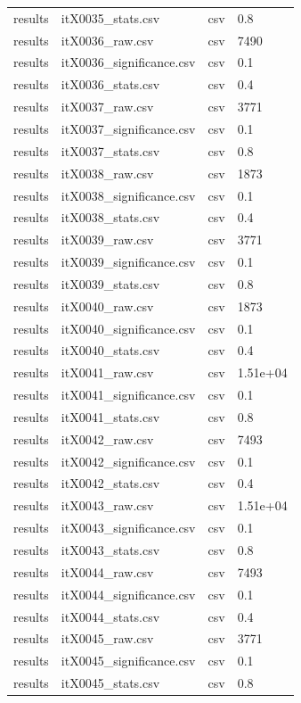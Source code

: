 \begin{landscape}
\begin{longtable}{p{}p{}p{}p{}}
results & itX0035\_stats.csv & csv & 0.8 \\
results & itX0036\_raw.csv & csv & 7490 \\
results & itX0036\_significance.csv & csv & 0.1 \\
results & itX0036\_stats.csv & csv & 0.4 \\
results & itX0037\_raw.csv & csv & 3771 \\
results & itX0037\_significance.csv & csv & 0.1 \\
results & itX0037\_stats.csv & csv & 0.8 \\
results & itX0038\_raw.csv & csv & 1873 \\
results & itX0038\_significance.csv & csv & 0.1 \\
results & itX0038\_stats.csv & csv & 0.4 \\
results & itX0039\_raw.csv & csv & 3771 \\
results & itX0039\_significance.csv & csv & 0.1 \\
results & itX0039\_stats.csv & csv & 0.8 \\
results & itX0040\_raw.csv & csv & 1873 \\
results & itX0040\_significance.csv & csv & 0.1 \\
results & itX0040\_stats.csv & csv & 0.4 \\
results & itX0041\_raw.csv & csv & 1.51e+04 \\
results & itX0041\_significance.csv & csv & 0.1 \\
results & itX0041\_stats.csv & csv & 0.8 \\
results & itX0042\_raw.csv & csv & 7493 \\
results & itX0042\_significance.csv & csv & 0.1 \\
results & itX0042\_stats.csv & csv & 0.4 \\
results & itX0043\_raw.csv & csv & 1.51e+04 \\
results & itX0043\_significance.csv & csv & 0.1 \\
results & itX0043\_stats.csv & csv & 0.8 \\
results & itX0044\_raw.csv & csv & 7493 \\
results & itX0044\_significance.csv & csv & 0.1 \\
results & itX0044\_stats.csv & csv & 0.4 \\
results & itX0045\_raw.csv & csv & 3771 \\
results & itX0045\_significance.csv & csv & 0.1 \\
results & itX0045\_stats.csv & csv & 0.8 \\

\end{longtable}
\end{landscape}
